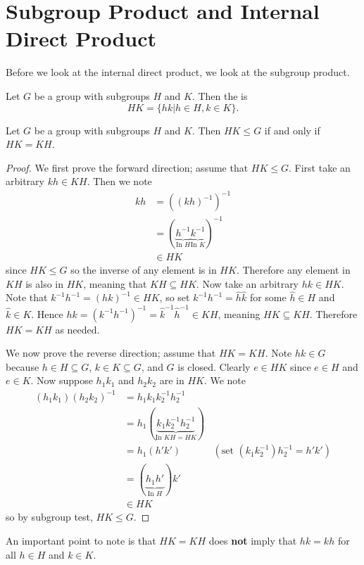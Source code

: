 \section{Subgroup Product and Internal Direct Product}
Before we look at the internal direct product, we look at the subgroup product.
\begin{definition}\label{definition-subgroup-product}
    Let $G$ be a group with subgroups $H$ and $K$. Then the  is
    \[
        HK = \{hk \vert h \in H, k \in K\}.
    \]
\end{definition}

\begin{proposition}\label{prop-subgroup-product-is-subgroup}
    Let $G$ be a group with subgroups $H$ and $K$. Then $HK \leq G$ if and only if $HK = KH$.
\end{proposition}
\begin{proof}
    We first prove the forward direction; assume that $HK \leq G$. First take an arbitrary $kh \in KH$. Then we note
    \begin{align*}
        kh &= \left(\left(kh\right)^{-1}\right)^{-1}\\
        &= (\underbrace{h^{-1}}_{\text{In } H}\underbrace{k^{-1}}_{\text{In } K})^{-1}\\
        &\in HK
    \end{align*}
    since $HK \leq G$ so the inverse of any element is in $HK$. Therefore any element in $KH$ is also in $HK$, meaning that $KH \subseteq HK$. Now take an arbitrary $hk \in HK$. Note that $k^{-1}h^{-1} = (hk)^{-1} \in HK$, so set $k^{-1}h^{-1} = \hat{h}\hat{k}$ for some $\hat{h} \in H$ and $\hat{k} \in K$. Hence $hk = \left(k^{-1}h^{-1}\right)^{-1} = \hat{k}^{-1}\hat{h}^{-1} \in KH$, meaning $HK \subseteq KH$. Therefore $HK = KH$ as needed.

    We now prove the reverse direction; assume that $HK = KH$. Note $hk \in G$ because $h \in H \subseteq G$, $k \in K \subseteq G$, and $G$ is closed. Clearly $e \in HK$ since $e \in H$ and $e \in K$. Now suppose $h_1k_1$ and $h_2k_2$ are in $HK$. We note
    \begin{align*}
        (h_1k_1)(h_2k_2)^{-1} &= h_1k_1k_2^{-1}h_2^{-1}\\
        &= h_1(\underbrace{k_1k_2^{-1}h_2^{-1}}_{\text{In } KH = HK})\\
        &= h_1(h'k') & (\text{set }(k_1k_2^{-1})h_2^{-1} = h'k')\\
        &= (\underbrace{h_1h'}_{\text{In } H})k'\\
        &\in HK
    \end{align*}
    so by subgroup test, $HK \leq G$.
\end{proof}
\begin{remark}
    An important point to note is that $HK = KH$ does \textbf{not} imply that $hk = kh$ for all $h \in H$ and $k \in K$.
\end{remark}

